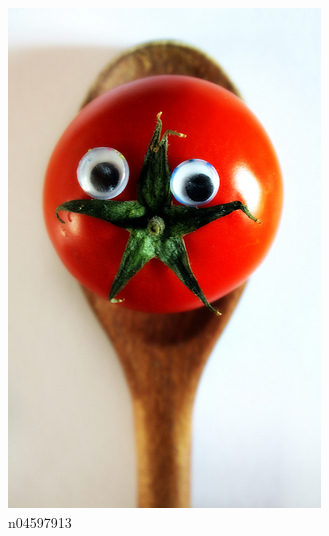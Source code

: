 \documentclass[11pt, a4paper]{article}
\begin{document}
\begin{figure}[h!tb]
    \begin{subfigure}[b]{0.30\textwidth}
    		\centering
        \includegraphics[width=\textwidth]{imagenet/examples/n04597913_10021.JPEG}
        \caption{n04597913}
        \label{fig:imagenet-examples-4}
    \end{subfigure}
    ~ %
    \begin{subfigure}[b]{0.30\textwidth}
    		\centering

\end{subfigure}
\end{figure}
\end{document}
